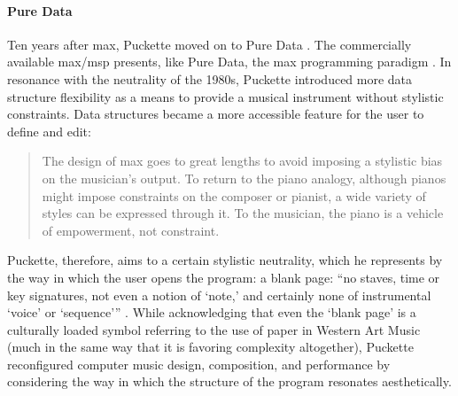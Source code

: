 	\paragraph{Pure Data}
	\label{computer:puredata}

	Ten years after \gls{max}, Puckette moved on to Pure Data \parencite{icmc/bbp2372.1997.060}. The commercially available \gls{max/msp} \parencite{DBLP:conf/icmc/Zicarelli98} presents, like Pure Data, the \gls{max} programming paradigm \parencite{DBLP:journals/comj/Puckette02}. In resonance with the neutrality of the 1980s, Puckette introduced more data structure flexibility as a means to provide a musical instrument without stylistic constraints. Data structures became a more accessible feature for the user to define and edit:

	\begin{quote}
		The design of \gls{max} goes to great lengths to avoid imposing a stylistic bias on the musician's output. To return to the piano analogy, although pianos might impose constraints on the composer or pianist, a wide variety of styles can be expressed through it. To the musician, the piano is a vehicle of empowerment, not constraint. \parencite{DBLP:journals/comj/Puckette02}
	\end{quote}

	Puckette, therefore, aims to a certain stylistic neutrality, which he represents by the way in which the user opens the program: a blank page: ``no staves, time or key signatures, not even a notion of `note,' and certainly none of instrumental `voice' or `sequence''' \parencite{DBLP:journals/comj/Puckette02}. While acknowledging that even the `blank page' is a culturally loaded symbol referring to the use of paper in Western Art Music (much in the same way that it is favoring complexity altogether), Puckette reconfigured computer music design, composition, and performance by considering the way in which the structure of the program resonates aesthetically.

